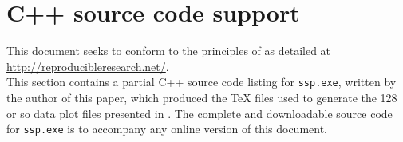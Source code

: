 
\chapter{C++ source code support}
\label{app:src_code}
This document seeks to conform to the principles of  as detailed at 
\\\indentx\url{http://reproducibleresearch.net/}.\\
This section contains a partial C++ source code listing for \lstinline{ssp.exe}, written by the author of this paper,
which produced the {\TeX} files
used to generate the 128 or so data plot files presented in .
The complete and downloadable source code for \lstinline{ssp.exe} is to accompany any online version of this document.


